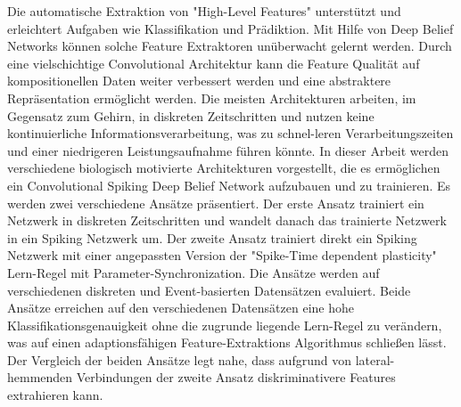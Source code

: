 Die automatische Extraktion von "High-Level Features" unterstützt und erleichtert Aufgaben wie Klassifikation und Prädiktion.
Mit Hilfe von Deep Belief Networks können solche Feature Extraktoren unüberwacht gelernt werden.
Durch eine vielschichtige Convolutional Architektur kann die Feature Qualität auf kompositionellen Daten weiter verbessert werden und eine abstraktere Repräsentation ermöglicht werden.
Die meisten Architekturen arbeiten, im Gegensatz zum Gehirn, in diskreten Zeitschritten und nutzen keine kontinuierliche Informationsverarbeitung, was zu schnel-leren Verarbeitungszeiten und einer niedrigeren Leistungsaufnahme führen könnte.
In dieser Arbeit werden verschiedene biologisch motivierte Architekturen vorgestellt, die es ermöglichen ein Convolutional Spiking Deep Belief Network aufzubauen und zu trainieren.
Es werden zwei verschiedene Ansätze präsentiert.
Der erste Ansatz trainiert ein Netzwerk in diskreten Zeitschritten und wandelt danach das trainierte Netzwerk in ein Spiking Netzwerk um.
Der zweite Ansatz trainiert direkt ein Spiking Netzwerk mit einer angepassten Version der "Spike-Time dependent plasticity" Lern-Regel mit Parameter-Synchronization.
Die Ansätze werden auf verschiedenen diskreten und Event-basierten Datensätzen evaluiert.
Beide Ansätze erreichen auf den verschiedenen Datensätzen eine hohe Klassifikationsgenauigkeit ohne die zugrunde liegende Lern-Regel zu verändern, was auf einen adaptionsfähigen Feature-Extraktions Algorithmus schließen lässt.
Der Vergleich der beiden Ansätze legt nahe, dass aufgrund von lateral-hemmenden Verbindungen der zweite Ansatz diskriminativere Features extrahieren kann. 

        